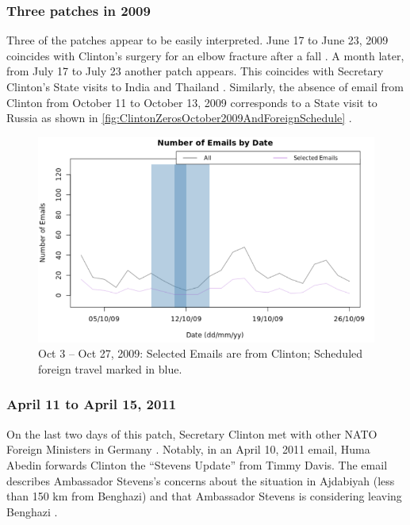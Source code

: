 \documentclass[journal]{vgtc}                %
\begin{document}
\subsubsection{Three patches in 2009}
Three of the patches appear to be easily interpreted.   June 17 to June 23, 2009 coincides with Clinton's surgery for an elbow fracture after a fall \cite{ClintonFracture2009}.  A month later, from July 17 to July 23 another patch appears.  This coincides with Secretary Clinton's State visits to India and Thailand \cite{ForeignSched}.  Similarly, the absence of email from Clinton from October 11 to  October 13, 2009 corresponds to a State visit to Russia as shown in  \autoref{fig:ClintonZerosOctober2009AndForeignSchedule} \cite{ForeignSched, visitRussia}.
\begin{figure}[h]
\begin{center}
\includegraphics[width=0.95\linewidth]{ClintonZerosOctober2009AndForeignSchedule}
\caption{Oct 3 -- Oct 27, 2009:  Selected Emails are from Clinton; Scheduled foreign travel marked in blue.}
\label{fig:ClintonZerosOctober2009AndForeignSchedule}
\end{center}
\end{figure}

\subsubsection{April 11 to April 15, 2011}
On the last two days of %
this patch, Secretary Clinton met with other NATO Foreign Ministers in Germany \cite{ForeignSched}.   Notably, in an April 10, 2011 email, Huma Abedin forwards Clinton the ``Stevens Update'' from Timmy Davis.  The email describes Ambassador Stevens's concerns about the situation in Ajdabiyah (less than 150 km from Benghazi) and that Ambassador Stevens is considering leaving Benghazi \cite{StevensUpdate}.
\end{document}
